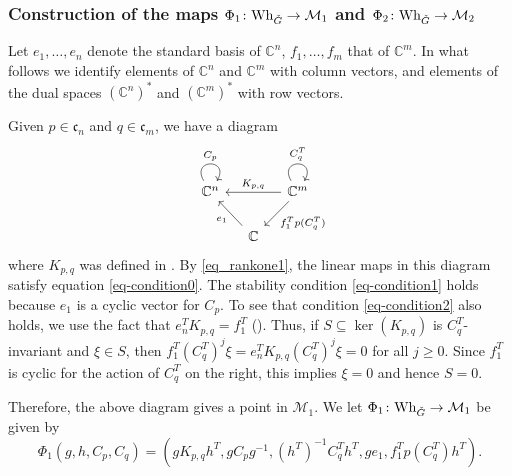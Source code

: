 \documentclass[11pt]{article}
\theoremstyle{definition}
\theoremstyle{plain}
\theoremstyle{remark}
\newcommand{\numberset}{\mathbb}
\newcommand{\C}{\numberset{C}}
\begin{document}
        \subsubsection*{Construction of the maps $\Phi_1\colon \mathrm{Wh}_{\Check{G}} \to \mathcal{M}_1$ and $\Phi_2\colon \mathrm{Wh}_{\Check{G}} \to \mathcal{M}_2$}
        
        Let $e_1,\dots,e_n$ denote the standard basis of $\C^n$, $f_1,\dots,f_m$ that of $\C^m$. In what follows we identify elements of $\C^n$ and $\C^m$ with column vectors, and elements of the dual spaces $(\C^n)^*$ and $(\C^m)^*$ with row vectors.
        
        Given $p \in \mathfrak{c}_n$ and $q \in \mathfrak{c}_m$, we have a diagram
        \[
            \begin{tikzcd}[column sep = small]
                \C^n  \arrow[out=120,in=60,loop,looseness=5,"C_p"] & & \C^m \arrow[ll, "K_{p,q}"']\arrow[out=120,in=60,loop,looseness=5,"C_q^T"] \arrow[ld, "f_1^Tp(C_q^T)"] \\
                & \C \arrow[lu, "e_1"]& 
            \end{tikzcd}
        \]
        where $K_{p,q}$ was defined in . By \eqref{eq_rankone1}, the linear maps in this diagram satisfy equation \eqref{eq-condition0}. The stability condition \eqref{eq-condition1} holds because $e_1$ is a cyclic vector for $C_p$. To see that condition \eqref{eq-condition2} also holds, we use the fact that $e_n^TK_{p,q}=f_1^T$ (). Thus, if $S \subseteq \ker(K_{p,q})$ is $C_q^T$-invariant and $\xi \in S$, then $f_1^T(C_q^T)^j\xi = e_n^TK_{p,q}(C_q^T)^{j}\xi = 0$ for all $j \geq 0$. Since $f_1^T$ is cyclic for the action of $C_q^T$ on the right, this implies $\xi = 0$ and hence $S = 0$.
        
        Therefore, the above diagram gives a point in $\mathcal{M}_1$. We let $\Phi_1\colon \mathrm{Wh}_{\Check{G}} \to \mathcal{M}_1$ be given by
        \begin{equation}\label{eq-phi1}
            \Phi_1(g,h,C_p,C_q) = (gK_{p,q}h^T, gC_pg^{-1}, (h^T)^{-1}C_q^Th^T,ge_1, f_1^Tp(C_q^T)h^T).
        \end{equation}
\end{document}
